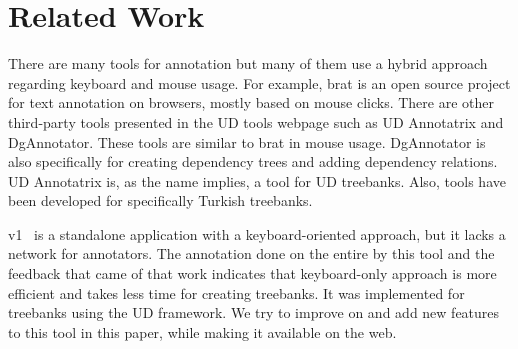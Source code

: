 \section{Related Work}
\label{sec:related}

There are many tools for annotation but many of them use a hybrid approach regarding keyboard and mouse usage.
For example, brat is an open source project for text annotation on browsers, mostly based on mouse clicks.\cite{brat}\cite{UD}
There are other third-party tools presented in the UD tools webpage such as UD Annotatrix\cite{tyers-etal:2018} and DgAnnotator\cite{dgannotator}.
These tools are similar to brat in mouse usage.
DgAnnotator is also specifically for creating dependency trees and adding dependency relations.
UD Annotatrix is, as the name implies, a tool for UD treebanks.
Also, tools have been developed for specifically Turkish treebanks.\cite{turk-etal-2019-turkish}

\boat{} v1~\cite{turk-etal-2019-turkish} is a standalone application with a keyboard-oriented approach, but it lacks a network for annotators.
The annotation done on the entire \bountreebank{} by this tool and the feedback that came of that work indicates that keyboard-only approach is more efficient and takes less time for creating treebanks.
It was implemented for treebanks using the UD framework.
We try to improve on and add new features to this tool in this paper, while making it available on the web.
